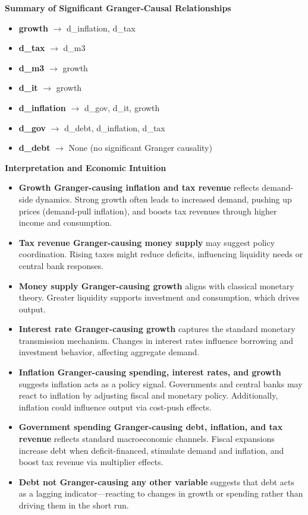 \documentclass[a4paper,12pt]{article}
\begin{document}
\textbf{Summary of Significant Granger-Causal Relationships}

\begin{itemize}
  \item \textbf{growth} $\rightarrow$ d\_inflation, d\_tax
  \item \textbf{d\_tax} $\rightarrow$ d\_m3
  \item \textbf{d\_m3} $\rightarrow$ growth
  \item \textbf{d\_it} $\rightarrow$ growth
  \item \textbf{d\_inflation} $\rightarrow$ d\_gov, d\_it, growth
  \item \textbf{d\_gov} $\rightarrow$ d\_debt, d\_inflation, d\_tax
  \item \textbf{d\_debt} $\rightarrow$ None (no significant Granger causality)
\end{itemize}

\textbf{Interpretation and Economic Intuition}

\begin{itemize}
  \item \textbf{Growth Granger-causing inflation and tax revenue} reflects demand-side dynamics. Strong growth often leads to increased demand, pushing up prices (demand-pull inflation), and boosts tax revenues through higher income and consumption.
  
  \item \textbf{Tax revenue Granger-causing money supply} may suggest policy coordination. Rising taxes might reduce deficits, influencing liquidity needs or central bank responses.

  \item \textbf{Money supply Granger-causing growth} aligns with classical monetary theory. Greater liquidity supports investment and consumption, which drives output.

  \item \textbf{Interest rate Granger-causing growth} captures the standard monetary transmission mechanism. Changes in interest rates influence borrowing and investment behavior, affecting aggregate demand.

  \item \textbf{Inflation Granger-causing spending, interest rates, and growth} suggests inflation acts as a policy signal. Governments and central banks may react to inflation by adjusting fiscal and monetary policy. Additionally, inflation could influence output via cost-push effects.

  \item \textbf{Government spending Granger-causing debt, inflation, and tax revenue} reflects standard macroeconomic channels. Fiscal expansions increase debt when deficit-financed, stimulate demand and inflation, and boost tax revenue via multiplier effects.

  \item \textbf{Debt not Granger-causing any other variable} suggests that debt acts as a lagging indicator—reacting to changes in growth or spending rather than driving them in the short run.
\end{itemize}
\end{document}
